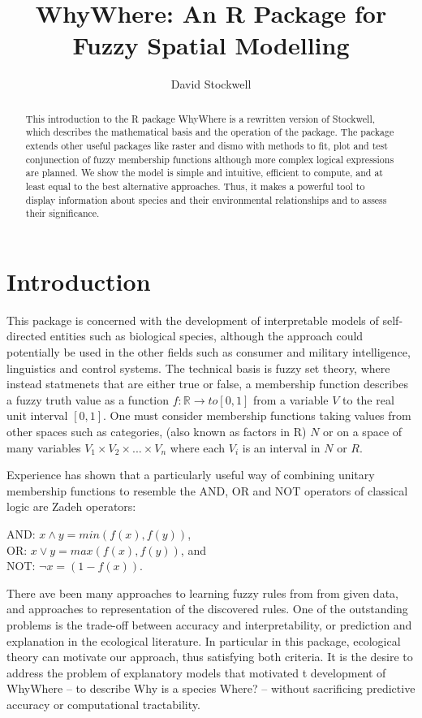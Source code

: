 \documentclass{article}
\title{WhyWhere: An R  Package for Fuzzy Spatial Modelling}
\author{David Stockwell \hspace{0.4cm} }
\date{}
\begin{document}



\maketitle

\begin{abstract}
This introduction to the R package WhyWhere is a rewritten
version of  Stockwell,  which
describes the mathematical basis and the operation of the package. The package extends other useful packages like raster and dismo with methods to fit, plot and test conjunection of fuzzy membership functions although more complex logical expressions are planned.  We show the model is simple and intuitive, efficient to compute, and at least equal to the best alternative approaches.  Thus, it makes a powerful tool to display information about species and their environmental relationships and to assess their significance.
\end{abstract}

\section{Introduction} \label{sec:intro}

This package is concerned with the development of interpretable models of self-directed entities such as biological species, although the approach could potentially be used in the other fields such as consumer and military intelligence, linguistics and control systems.  The technical basis is fuzzy set theory, where instead statmenets that are either true or false, a membership function describes a fuzzy truth value as a function $f: \mathbb{R} \rightarrow to [0,1]$ from a variable $V$ to the real unit interval $[0,1]$.  One must consider membership functions taking values from other spaces such as categories, (also known as factors in R) $N$ or on a space of many variables $V_1 \times V_2 \times ... \times V_n$ where each $V_i$ is an interval in $N$ or $R$. 

Experience has shown that a particularly useful way of combining unitary membership functions to resemble the AND, OR and NOT operators of classical logic are Zadeh operators:

AND: $x \land y = min(f(x),f(y))$, \\
OR: $x \lor y = max(f(x),f(y))$, and \\
NOT: $ \lnot x = (1-f(x))$.  


There ave been many approaches to learning fuzzy rules from from given data, and approaches to representation of the discovered rules.  One of the outstanding problems is the trade-off between accuracy and interpretability, or prediction and explanation in the ecological literature.  In particular in this package, ecological theory can motivate our approach, thus satisfying both criteria.  It is the desire to address the problem of explanatory models that motivated t development of WhyWhere -- to describe Why is a species Where? -- without sacrificing predictive accuracy or computational tractability.  
\end{document}
